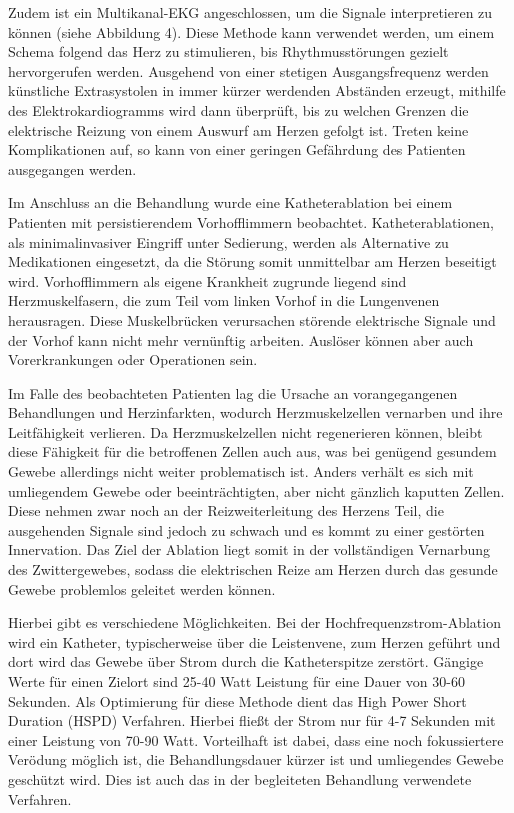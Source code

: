 \documentclass[11pt,a4paper,titlepage]{scrartcl}
\begin{document}
\newpage
Zudem ist ein Multikanal-EKG angeschlossen, um die Signale interpretieren zu können (siehe Abbildung 4).
Diese Methode kann verwendet werden, um einem Schema folgend das Herz zu stimulieren, bis Rhythmusstörungen gezielt hervorgerufen werden.
Ausgehend von einer stetigen Ausgangsfrequenz werden künstliche Extrasystolen in immer kürzer werdenden Abständen erzeugt, mithilfe des Elektrokardiogramms wird dann überprüft, bis zu welchen Grenzen die elektrische Reizung von einem Auswurf am Herzen gefolgt ist.
Treten keine Komplikationen auf, so kann von einer geringen Gefährdung des Patienten ausgegangen werden. \medskip

Im Anschluss an die Behandlung wurde eine Katheterablation bei einem Patienten mit persistierendem Vorhofflimmern beobachtet.
Katheterablationen, als minimalinvasiver Eingriff unter Sedierung, werden als Alternative zu Medikationen eingesetzt, da die Störung somit unmittelbar am Herzen beseitigt wird.
Vorhofflimmern als eigene Krankheit zugrunde liegend sind Herzmuskelfasern, die zum Teil vom linken Vorhof in die Lungenvenen herausragen.
Diese Muskelbrücken verursachen störende elektrische Signale und der Vorhof kann nicht mehr vernünftig arbeiten.
Auslöser können aber auch Vorerkrankungen oder Operationen sein. \medskip

Im Falle des beobachteten Patienten lag die Ursache an vorangegangenen Behandlungen und Herzinfarkten, wodurch Herzmuskelzellen vernarben und ihre Leitfähigkeit verlieren.
Da Herzmuskelzellen nicht regenerieren können, bleibt diese Fähigkeit für die betroffenen Zellen auch aus, was bei genügend gesundem Gewebe allerdings nicht weiter problematisch ist.
Anders verhält es sich mit umliegendem Gewebe oder beeinträchtigten, aber nicht gänzlich kaputten Zellen.
Diese nehmen zwar noch an der Reizweiterleitung des Herzens Teil, die ausgehenden Signale sind jedoch zu schwach und es kommt zu einer gestörten Innervation.
Das Ziel der Ablation liegt somit in der vollständigen Vernarbung des Zwittergewebes, sodass die elektrischen Reize am Herzen durch das gesunde Gewebe problemlos geleitet werden können. \medskip

Hierbei gibt es verschiedene Möglichkeiten.
Bei der Hochfrequenzstrom-Ablation wird ein Katheter, typischerweise über die Leistenvene, zum Herzen geführt und dort wird das Gewebe über Strom durch die Katheterspitze zerstört.
Gängige Werte für einen Zielort sind 25-40 Watt Leistung für eine Dauer von 30-60 Sekunden.
Als Optimierung für diese Methode dient das High Power Short Duration (HSPD) Verfahren.
Hierbei fließt der Strom nur für 4-7 Sekunden mit einer Leistung von 70-90 Watt.
Vorteilhaft ist dabei, dass eine noch fokussiertere Verödung möglich ist, die Behandlungsdauer kürzer ist und umliegendes Gewebe geschützt wird.
Dies ist auch das in der begleiteten Behandlung verwendete Verfahren.\medskip
\end{document}

